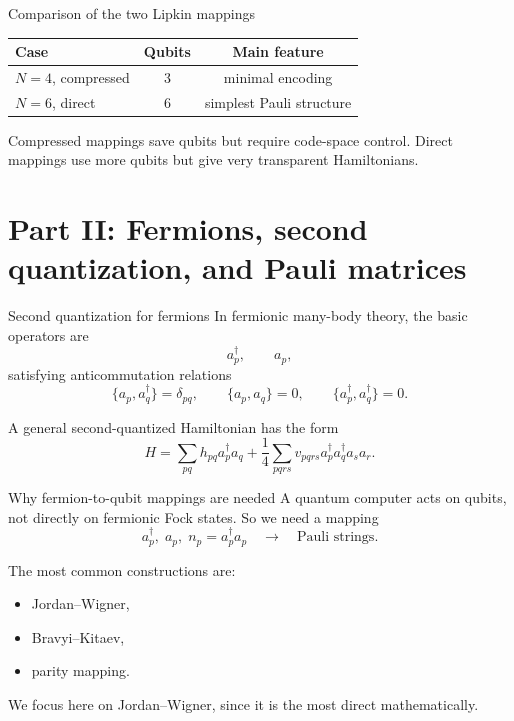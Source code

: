 \documentclass[aspectratio=169]{beamer}
\begin{document}
\begin{frame}{Comparison of the two Lipkin mappings}
\begin{center}
\begin{tabular}{lcc}
\hline
Case & Qubits & Main feature \\
\hline
\(N=4\), compressed & 3 & minimal encoding \\
\(N=6\), direct & 6 & simplest Pauli structure \\
\hline
\end{tabular}
\end{center}

Compressed mappings save qubits but require code-space control.
Direct mappings use more qubits but give very transparent Hamiltonians.
\end{frame}

\section{Part II: Fermions, second quantization, and Pauli matrices}

\begin{frame}{Second quantization for fermions}
In fermionic many-body theory, the basic operators are
\[
a_p^\dagger,\qquad a_p,
\]
satisfying anticommutation relations
\[
\{a_p,a_q^\dagger\}=\delta_{pq},
\qquad
\{a_p,a_q\}=0,
\qquad
\{a_p^\dagger,a_q^\dagger\}=0.
\]

A general second-quantized Hamiltonian has the form
\[
H
=
\sum_{pq} h_{pq} a_p^\dagger a_q
+
\frac{1}{4}\sum_{pqrs} v_{pqrs} a_p^\dagger a_q^\dagger a_s a_r.
\]
\end{frame}

\begin{frame}{Why fermion-to-qubit mappings are needed}
A quantum computer acts on qubits, not directly on fermionic Fock states.
So we need a mapping
\[
a_p^\dagger,\; a_p,\; n_p=a_p^\dagger a_p
\quad \longrightarrow \quad
\text{Pauli strings}.
\]

The most common constructions are:
\begin{itemize}
\item Jordan--Wigner,
\item Bravyi--Kitaev,
\item parity mapping.
\end{itemize}

We focus here on Jordan--Wigner, since it is the most direct mathematically.
\end{frame}
\end{document}
